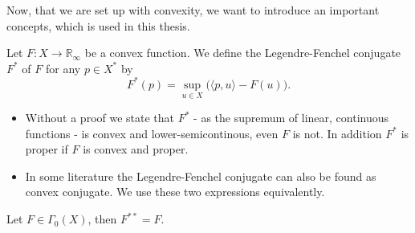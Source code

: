     Now, that we are set up with convexity, we want to introduce an important concepts, which is used in this thesis.

    \begin{definition} %
    \label{def:legendre_fenchel_conjugate}

        Let $F: X \longrightarrow \mathbb{R}_{\infty}$ be a convex function. We define the Legendre-Fenchel conjugate $F^{\ast}$ of $F$ for any $p \in X^{\ast}$ by
            \begin{equation}
                F^{\ast}(p) = \sup_{u \in X} \big( \langle p, u \rangle - F(u) \big).
                \label{eq:legendre_fenchel_conjugate}
            \end{equation}

    \end{definition}

    \begin{remark} %
        \begin{itemize}
            \item Without a proof we state that $F^{\ast}$ - as the supremum of linear, continuous functions - is convex and lower-semicontinous, even $F$ is not. In addition $F^{\ast}$ is proper if $F$ is convex and proper.
            \item In some literature the Legendre-Fenchel conjugate can also be found as convex conjugate. We use these two expressions equivalently.
        \end{itemize}
    \end{remark}

    \begin{theorem} %
        Let $F \in \Gamma_{0}(X)$, then $F^{\ast\ast} = F$.
    \end{theorem}

